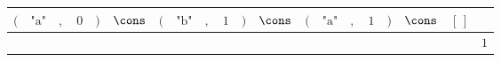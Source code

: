 {\scriptsize\setlength{\tabcolsep}{1.5pt}%
\begin{tabular}{ccccccccccccccccccc|l}
$($ & $\text{"a"}$ & $,$ & $\text{0}$ & $)$ & $\cons$ & $($ & $\text{"b"}$ & $,$ & $\text{1}$ & $)$ & $\cons$ & $($ & $\text{"a"}$ & $,$ & $\text{1}$ & $)$ & $\cons$ & $[\,]$ & \\ \hline
\gcell{$$} & \gcell{$\posC{\circ}$} & \gcell{$\posC{\circ}$} & \gcell{$\posD{\bullet}$} & \gcell{$$} & \gcell{$\posC{\circ}$} & \gcell{$$} & \gcell{$\posC{\circ}$} & \gcell{$\posC{\circ}$} & \gcell{$$} & \gcell{$$} & \gcell{$\posC{\circ}$} & \gcell{$$} & \gcell{$\posC{\circ}$} & \gcell{$\posC{\circ}$} & \gcell{$\posD{\bullet}$} & \gcell{$$} & \gcell{$\posC{\circ}$} & \gcell{$\posC{\circ}$} & $\text{1}$ \\
\end{tabular}}
